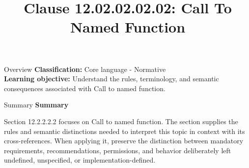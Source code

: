 \documentclass[10pt,letterpaper]{article}
\title{Clause 12.02.02.02.02: Call To Named Function}
\author{}
\date{}
\begin{document}
\maketitle
\begin{CornellOverviewBox}{Overview}
\textbf{Classification:} Core language - Normative\\[2pt]
\textbf{Learning objective:} Understand the rules, terminology, and semantic consequences associated with Call to named function.
\end{CornellOverviewBox}\begin{CornellSummaryBox}{Summary}
{\sffamily\bfseries\color{Accent} Summary}\par\vspace{3pt}Section 12.2.2.2.2 focuses on Call to named function. The section supplies the rules and semantic distinctions needed to interpret this topic in context with its cross-references. When applying it, preserve the distinction between mandatory requirements, recommendations, permissions, and behavior deliberately left undefined, unspecified, or implementation-defined.
\end{CornellSummaryBox}
\end{document}
